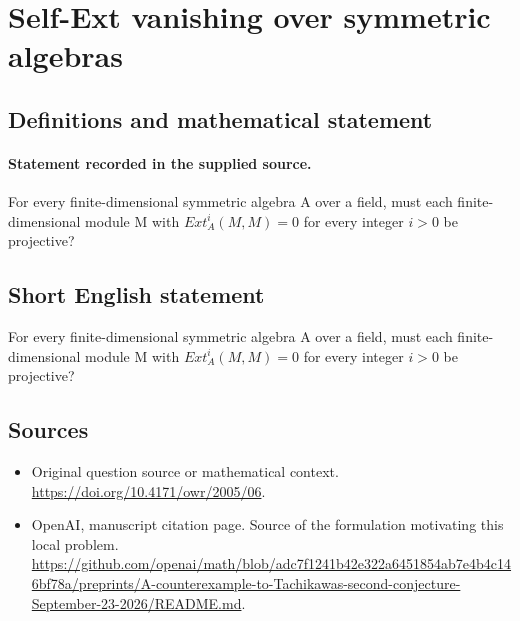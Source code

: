 \documentclass[11pt]{article}
\begin{document}
\section*{Self-Ext vanishing over symmetric algebras}\label{statement}
\subsection{Definitions and mathematical statement}
\paragraph{Statement recorded in the supplied source.}
For every finite-dimensional symmetric algebra A over a field, must each finite-dimensional module M with $Ext_A^i(M,M)=0$ for every integer $i>0$ be projective?
\subsection{Short English statement}
For every finite-dimensional symmetric algebra A over a field, must each finite-dimensional module M with $Ext_A^i(M,M)=0$ for every integer $i>0$ be projective?
\subsection{Sources}
\begin{itemize}
\item[S1] Original question source or mathematical context.
\url{https://doi.org/10.4171/owr/2005/06}.
\item[S2] OpenAI, manuscript citation page. Source of the formulation motivating this local problem.
\url{https://github.com/openai/math/blob/adc7f1241b42e322a6451854ab7e4b4c146bf78a/preprints/A-counterexample-to-Tachikawas-second-conjecture-September-23-2026/README.md}.
\end{itemize}
\end{document}
